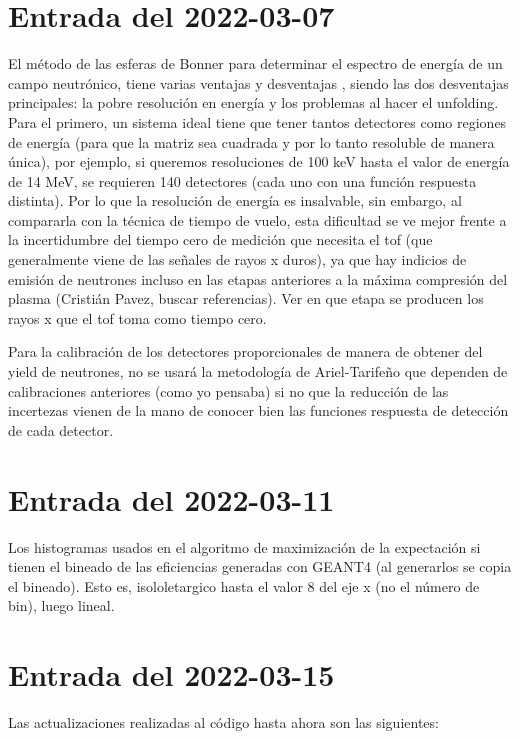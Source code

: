 \documentclass[11pt,letterpaper]{article}
\begin{document}
\section{Entrada del 2022-03-07}\label{2022-03-07}
El método de las esferas de Bonner para determinar el espectro de energía de un campo neutrónico, tiene varias ventajas y desventajas \cite{Thomas2002}, siendo las dos desventajas principales: la pobre resolución en energía y los problemas al hacer el unfolding. Para el primero, un sistema ideal tiene que tener tantos detectores como regiones de energía (para que la matriz sea cuadrada y por lo tanto resoluble de manera única), por ejemplo, si queremos resoluciones de 100 keV hasta el valor de energía de 14 MeV, se requieren 140 detectores (cada uno con una función respuesta distinta). Por lo que la resolución de energía es insalvable, sin embargo, al compararla con la técnica de tiempo de vuelo, esta dificultad se ve mejor frente a la incertidumbre del tiempo cero de medición que necesita el tof (que generalmente viene de las señales de rayos x duros), ya que hay indicios de emisión de neutrones incluso en las etapas anteriores a la máxima compresión del plasma (Cristián Pavez, buscar referencias). Ver en que etapa se producen los rayos x que el tof toma como tiempo cero.

Para la calibración de los detectores proporcionales de manera de obtener del yield de neutrones, no se usará la metodología de Ariel-Tarifeño que dependen de calibraciones anteriores \cite{tarifeno2014} (como yo pensaba) si no que la reducción de las incertezas vienen de la mano de conocer bien las funciones respuesta de detección de cada detector.

\section{Entrada del 2022-03-11}\label{2022-03-11}

Los histogramas usados en el algoritmo de maximización de la expectación si tienen el bineado de las eficiencias generadas con GEANT4 (al generarlos se copia el bineado). Esto es, isololetargico hasta el valor 8 del eje x (no el número de bin), luego lineal.

\section{Entrada del 2022-03-15}\label{2022-03-15}

Las actualizaciones realizadas al código hasta ahora son las siguientes:
\end{document}
